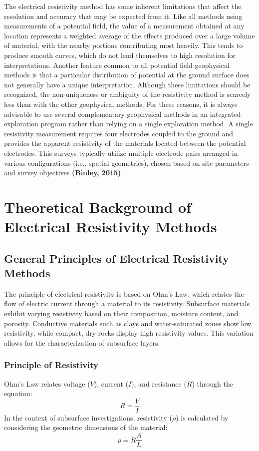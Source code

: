 \documentclass[12pt,a4paper]{report}
\begin{document}
The electrical resistivity method has some inherent limitations that affect the resolution and accuracy that may be expected from it.  Like all methods using measurements of a potential field, the value of a measurement obtained at any location represents a weighted average of the effects produced over a large volume of material, with the nearby portions contributing most heavily.  This tends to produce smooth curves, which do not lend themselves to high resolution for interpretations.  Another feature common to all potential field geophysical methods is that a particular distribution of potential at the ground surface does not generally have a unique interpretation.  Although these limitations should be recognized, the non-uniqueness or ambiguity of the resistivity method is scarcely less than with the other geophysical methods.  For these reasons, it is always advisable to use several complementary geophysical methods in an integrated exploration program rather than relying on a single exploration method. A single resistivity measurement requires four electrodes coupled to the ground and provides the apparent resistivity of the materials located between the potential electrodes. This surveys typically utilize multiple electrode pairs arranged in various configurations (i.e., spatial geometries), chosen based on site parameters and survey objectives \textbf{(Binley, 2015)}.

\section{Theoretical Background of Electrical Resistivity Methods}

\subsection{General Principles of Electrical Resistivity Methods}
The principle of electrical resistivity is based on Ohm's Law, which relates the flow of electric current through a material to its resistivity. Subsurface materials exhibit varying resistivity based on their composition, moisture content, and porosity. Conductive materials such as clays and water-saturated zones show low resistivity, while compact, dry rocks display high resistivity values. This variation allows for the characterization of subsurface layers.

\subsubsection{Principle of Resistivity}
Ohm's Law relates voltage ($V$), current ($I$), and resistance ($R$) through the equation:
\begin{equation}
    R = \frac{V}{I}
\end{equation}
In the context of subsurface investigations, resistivity ($\rho$) is calculated by considering the geometric dimensions of the material:
\begin{equation}
\rho = R \frac{A}{L}
\end{equation}
\end{document}
